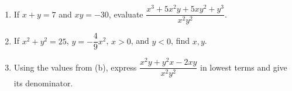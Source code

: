 \begin{enumerate}\item If $x+y=7$ and $xy=-30$, evaluate $\dfrac{x^3+5x^2y+5xy^2+y^3}{x^2y^2}$.\item If $x^2+y^2=25$, $y=-\dfrac{4}{9}x^2$, $x>0$, and $y<0$, find $x,y$.\item Using the values from (b), express $\dfrac{x^2y+y^2x-2xy}{x^2y^2}$ in lowest terms and give its denominator.\end{enumerate}
